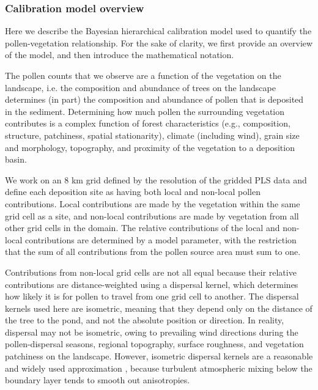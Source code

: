 \documentclass[12pt]{article}
\begin{document}

\subsubsection{Calibration model overview}
\label{sec:cal}

Here we describe the Bayesian hierarchical calibration model used to
quantify the pollen-vegetation relationship. For the sake of clarity,
we first provide an overview of the model, and then introduce the
mathematical notation.

The pollen counts that we observe are a function of the vegetation on
the landscape, i.e. the composition and abundance of trees on the
landscape determines (in part) the composition and abundance of pollen
that is deposited in the sediment. Determining how much pollen the
surrounding vegetation contributes is a complex function of forest
characteristics (e.g., composition, structure, patchiness, spatial
stationarity), climate (including wind), grain size and morphology,
topography, and proximity of the vegetation to a deposition basin.

We work on an 8 km grid defined by the resolution of the gridded PLS
data and define each deposition site as having both local and
non-local pollen contributions. Local contributions are made by the
vegetation within the same grid cell as a site, and non-local
contributions are made by vegetation from all other grid cells in the
domain. The relative contributions of the local and non-local
contributions are determined by a model parameter, with the
restriction that the sum of all contributions from the pollen source
area must sum to one.

Contributions from non-local grid cells are not all equal because
their relative contributions are distance-weighted using a dispersal
kernel, which determines how likely it is for pollen to travel from
one grid cell to another. The dispersal kernels used here are
isometric, meaning that they depend only on the distance of the tree
to the pond, and not the absolute position or direction. In reality,
dispersal may not be isometric, owing to prevailing wind directions
during the pollen-dispersal seasons, regional topography, surface
roughness, and vegetation patchiness on the landscape. However,
isometric dispersal kernels are a reasonable and widely used
approximation \citep{sugita2007theory1, sugita2007theory2}, because
turbulent atmospheric mixing below the boundary layer tends to smooth
out anisotropies.
\end{document}
